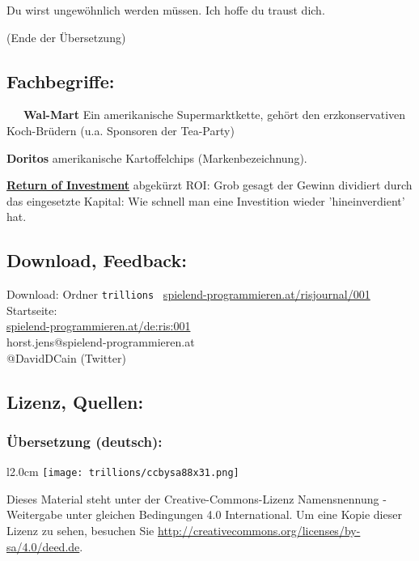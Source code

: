 \documentclass[10pt,a4paper,ngerman,twoside]{article} %
\begin{document}
Du wirst ungewöhnlich werden müssen. Ich hoffe du traust dich.


(Ende der Übersetzung)

\subsection*{Fachbegriffe:}

~~~\textbf{Wal-Mart} Ein amerikanische Supermarktkette, gehört den erzkonservativen Koch-Brüdern (u.a. Sponsoren der Tea-Party)

\textbf{Doritos} amerikanische Kartoffelchips (Markenbezeichnung). 

\href{https://de.wikipedia.org/wiki/Return_on_Investment}{\textbf{Return of Investment}} abgekürzt ROI: Grob gesagt der Gewinn dividiert durch das eingesetzte Kapital: Wie schnell man eine Investition wieder 'hineinverdient' hat. 

\subsection*{Download, Feedback:}
\footnotesize{
Download: Ordner \texttt{trillions} \Mundus\ \href{http://spielend-programmieren.at/risjournal/001}{spielend-programmieren.at/risjournal/001}\\
Startseite:\\
\href{http://spielend-programmieren.at/de:ris:001}{spielend-programmieren.at/de:ris:001}\\ 
\Letter\: horst.jens@spielend-programmieren.at\\
\Letter\: @DavidDCain (Twitter)\\}
\normalsize 

\subsection*{Lizenz, Quellen:}

\subsubsection*{Übersetzung (deutsch):}

\begin{wrapfigure}{l}{2.0cm}
\texttt{[image: trillions/ccbysa88x31.png]}
\end{wrapfigure}
Dieses Material steht unter der Creative-Commons-Lizenz Namensnennung - Weitergabe unter gleichen Bedingungen 4.0 International. Um eine Kopie dieser Lizenz zu sehen, besuchen Sie \url{http://creativecommons.org/licenses/by-sa/4.0/deed.de}.
\end{document}
